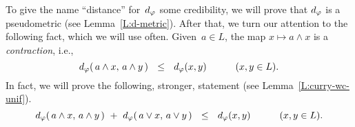 \documentclass[main.tex]{subfiles}
\begin{document}
To give the name ``distance'' for~$d_{\smash{\varphi}}$ some credibility,
we will prove that $d_{\smash{\varphi}}$ 
is a pseudometric (see Lemma~\ref{L:d-metric}).
After that,
we turn our attention to the following fact,
which we will use often.
Given~$a\in L$, the map $x\mapsto a\wedge x$ is a \emph{contraction}, i.e.,
\begin{equation*}
d_{\smash{\varphi}}(\,a\wedge x,\, a\wedge y\,)
\ \ \leq\ \ d_{\smash{\varphi}}(x,y)
\qquad\quad(x,y\in L).
\end{equation*}
In fact,
we will prove the following, stronger, statement
(see Lemma~\ref{L:curry-wc-unif}).
\begin{equation*}
\ld\varphi(\,a\wedge x,\, a\wedge y\,) \ +\ 
\ld\varphi(\,a\vee x,\, a\vee y\,)
\ \ \leq\ \ \ld\varphi(x,y)
\qquad\quad(x,y\in L).
\end{equation*}
\end{document}
